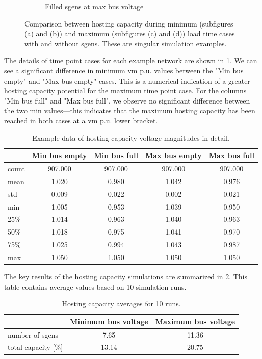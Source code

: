 \documentclass[a4paper,10pt]{report}
\begin{document}
\begin{figure}
\begin{subfigure}[b]{0.475\textwidth}
		\caption[]
		{{\small Filled sgens at max bus voltage}}    
		\label{hopsting_cap_figures_d}
	\end{subfigure}
	\caption[Comparison of hosting capacities for time extremes]
	{\small Comparison between hosting capacity during minimum (subfigures (a) and (b)) and maximum (subfigures (c) and (d)) load time cases with and without sgens. These are singular simulation examples.} 
	\label{hopsting_cap_figures}
\end{figure}
\FloatBarrier

The details of time point cases for each example network are shown in \cref{extremes_summary}. We can see a significant difference in minimum vm p.u. values between the "Min bus empty" and "Max bus empty" cases. This is a numerical indication of a greater hosting capacity potential for the maximum time point case. For the columns "Min bus full" and "Max bus full", we observe no significant difference between the two min values---this indicates that the maximum hosting capacity has been reached in both cases at a vm p.u. lower bracket.

\begin{table}[htpb]
	\centering
	\begin{tabular}{lcccc}
		\toprule
		& Min bus empty & Min bus full & Max bus empty & Max bus full \\
		\midrule
		count & 907.000 & 907.000 & 907.000 & 907.000 \\
		mean & 1.020 & 0.980 & 1.042 & 0.976 \\
		std & 0.009 & 0.022 & 0.002 & 0.021 \\
		min & 1.005 & 0.953 & 1.039 & 0.950 \\
		25\% & 1.014 & 0.963 & 1.040 & 0.963 \\
		50\% & 1.018 & 0.975 & 1.041 & 0.970 \\
		75\% & 1.025 & 0.994 & 1.043 & 0.987 \\
		max & 1.050 & 1.050 & 1.050 & 1.050 \\
		\bottomrule
	\end{tabular}
	\caption[Hosting capacity voltage magnitudes in detail]{Example data of hosting capacity voltage magnitudes in detail.}
	\label{extremes_summary}
\end{table}

The key results of the hosting capacity simulations are summarized in \cref{hosting_cap_stats}. This table contains average values based on 10 simulation runs.

\begin{table}[htpb]
	\centering
	\begin{tabular}{lcc}
		\toprule
		& Minimum bus voltage & Maximum bus voltage \\
		\midrule
		number of sgens & 7.65 & 11.36 \\
		total capacity [\%] & 13.14 & 20.75 \\
		\bottomrule
	\end{tabular}
	\caption[Hosting capacity results]{Hosting capacity averages for 10 runs.}
	\label{hosting_cap_stats}
\end{table}
\end{document}
